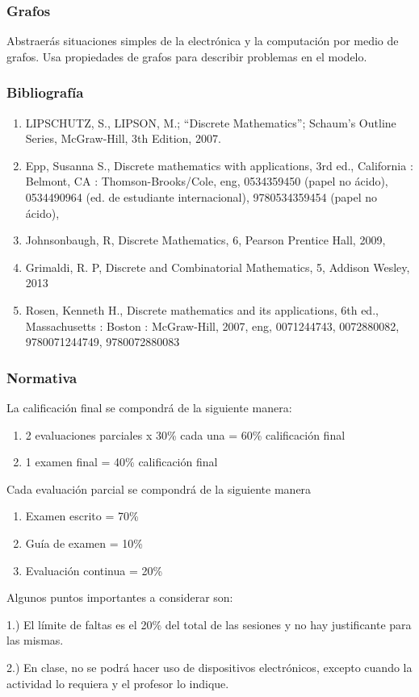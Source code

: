 \documentclass[xcolor={svgnames},
  hyperref={colorlinks}, 
  spanish, 12pt]{beamer}
\numberwithin{equation}{section} %
\numberwithin{figure}{section} %
\theoremstyle{plain}
\theoremstyle{definition}
\theoremstyle{remark}
\begin{document}
\begin{frame}
 \frametitle{Grafos}
 Abstraer\'as situaciones simples de la electrónica y la computación por medio de grafos. Usa propiedades de grafos para
describir problemas en el modelo.

\end{frame}


\begin{frame}
 \frametitle{Bibliografía}
\begin{enumerate}
 \item LIPSCHUTZ, S., LIPSON, M.; ``Discrete Mathematics''; Schaum’s Outline Series, McGraw-Hill, 3th Edition, 2007. \pause
 \item Epp, Susanna S., Discrete mathematics with applications, 3rd ed., California : Belmont, CA : Thomson-Brooks/Cole, eng, 
0534359450 (papel no ácido), 0534490964 (ed. de estudiante internacional), 9780534359454 (papel no ácido),
\item  Johnsonbaugh, R, Discrete Mathematics, 6, Pearson Prentice Hall, 2009, 
\item Grimaldi, R. P, Discrete and Combinatorial Mathematics, 5, Addison Wesley, 2013
\item  Rosen, Kenneth H., Discrete mathematics and its applications, 6th ed., Massachusetts : Boston : McGraw-Hill, 2007, eng, 
0071244743, 0072880082, 9780071244749, 9780072880083
\end{enumerate}
\end{frame}

\begin{frame}
 \frametitle{Normativa}

La calificación final se compondrá de la siguiente manera:
\begin{enumerate}
 \item 2 evaluaciones parciales x 30\% cada una = 60\% calificación final
 \item 1 examen final = 40\% calificación final
\end{enumerate}

\pause 

Cada evaluación parcial se compondrá de la siguiente manera
\begin{enumerate}
 \item Examen escrito = 70\%
 \item Gu\'ia de examen = 10\%
 \item Evaluaci\'on continua = 20\%
\end{enumerate}

\end{frame}

\begin{frame}
Algunos puntos importantes a considerar son:

1.) El límite de faltas es el 20\% del total de las sesiones y no hay justificante para las mismas.

2.) En clase, no se podrá hacer uso de dispositivos electrónicos, excepto cuando la actividad lo requiera y el profesor lo indique.

\end{frame}
\end{document}
